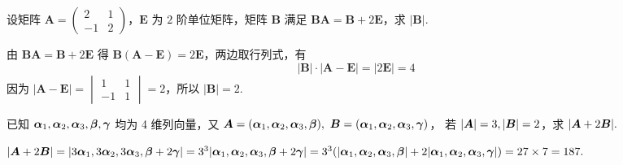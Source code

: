 \begin{example}[2006 数一]
    设矩阵 $\boldsymbol{A}=\begin{pmatrix}
            2  & 1 \\
            -1 & 2
        \end{pmatrix}$，$\boldsymbol{E}$ 为 $2$ 阶单位矩阵，矩阵 $\boldsymbol{B}$ 满足 $\boldsymbol{BA}=\boldsymbol{B}+2\boldsymbol{E}$，求 $|\boldsymbol{B}|$.
\end{example}
\begin{solution}
    由 $\boldsymbol{BA}=\boldsymbol{B}+2\boldsymbol{E}$ 得 $\boldsymbol{B}(\boldsymbol{A}-\boldsymbol{E})=2\boldsymbol{E}$，两边取行列式，有
    $$|\boldsymbol{B}|\cdot|\boldsymbol{A}-\boldsymbol{E}|=|2\boldsymbol{E}|=4$$
    因为 $|\boldsymbol{A}-\boldsymbol{E}|=\begin{vmatrix}
            1  & 1 \\
            -1 & 1
        \end{vmatrix}=2$，所以 $|\boldsymbol{B}|=2.$
\end{solution}

\begin{example}
    已知 $\vb*{\alpha}_1,\vb*{\alpha}_2,\vb*{\alpha}_3,\vb*{\beta},\vb*{\gamma}$ 均为 4 维列向量，又 $\vb*{A}=(\vb*{\alpha}_1,\vb*{\alpha}_2,\vb*{\alpha}_3,\vb*{\beta}),~\vb*{B}=(\vb*{\alpha}_1,\vb*{\alpha}_2,\vb*{\alpha}_3,\vb*{\gamma})$，
    若 $|\vb*{A}|=3,|\vb*{B}|=2$，求 $|\vb*{A}+2\vb*{B}|.$
\end{example}
\begin{solution}
    $|\vb*{A}+2\vb*{B}|=|3\vb*{\alpha}_1,3\vb*{\alpha}_2,3\vb*{\alpha}_3,\vb*{\beta}+2\vb*{\gamma}|=3^3|\vb*{\alpha}_1,\vb*{\alpha}_2,\vb*{\alpha}_3,\vb*{\beta}+2\vb*{\gamma}|=3^3\qty(|\vb*{\alpha}_1,\vb*{\alpha}_2,\vb*{\alpha}_3,\vb*{\beta}|+2|\vb*{\alpha}_1,\vb*{\alpha}_2,\vb*{\alpha}_3,\vb*{\gamma}|)=27\times 7=187.$
\end{solution}
